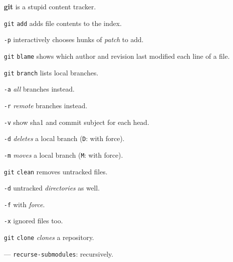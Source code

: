 \documentclass{reference_card}
\begin{document}
\renewcommand{\footrulewidth}{0.4pt}
\fancyfoot[LF]{}

\begin{multicols*}{3}
\textbf{git} is a stupid content tracker.

\begin{compactenum}
\item [\texttt{git}] \texttt{add} adds file contents to the index.
\item [\texttt{-p}] interactively chooses hunks of \emph{patch} to add.
\end{compactenum}

\begin{compactenum}
\item [\texttt{git}] \texttt{blame} shows which author and revision last modified each line of a file.
\end{compactenum}

\begin{compactenum}
\item [\texttt{git}] \texttt{branch} lists local branches.
\item [\texttt{-a}] \emph{all} branches instead.
\item [\texttt{-r}] \emph{remote} branches instead.
\item [\texttt{-v}] show sha1 and commit subject for each head.
\item [\texttt{-d}] \emph{deletes} a local branch (\texttt{D}: with force).
\item [\texttt{-m}] \emph{moves} a local branch (\texttt{M}: with force).
\end{compactenum}

\begin{compactenum}
\item [\texttt{git}] \texttt{clean} removes untracked files.
\item [\texttt{-d}] untracked \emph{directories} as well.
\item [\texttt{-f}] with \emph{force}.
\item [\texttt{-x}] ignored files too.
\end{compactenum}

\begin{compactenum}
\item [\texttt{git}] \texttt{clone} \emph{clones} a repository.
\item [---] \texttt{recurse-submodules}: recursively.
\end{compactenum}


\end{multicols*}
\end{document}
